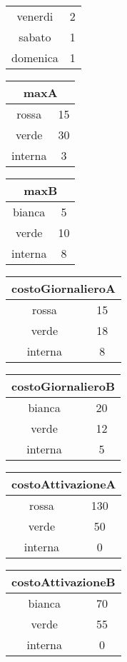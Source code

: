 \begin{center}
\begin{tabular}{| c | c |}
    venerdi & 2 \\
    sabato & 1 \\
    domenica & 1 \\
    \hline
\end{tabular}
\newline
\begin{tabular}{| c | c |}
    \hline
    \multicolumn{2}{|c|}{maxA}\\
    \hline \hline
    rossa & 15 \\
    verde & 30 \\
    interna & 3 \\
    \hline    
\end{tabular}
\begin{tabular}{| c | c |}
    \hline
    \multicolumn{2}{|c|}{maxB} \\
    \hline \hline
    bianca & 5 \\
    verde & 10 \\
    interna & 8 \\
    \hline    
\end{tabular}
\begin{tabular}{| c | c |}
    \hline
    \multicolumn{2}{|c|}{costoGiornalieroA}\\
    \hline \hline
    rossa & 15 \\
    verde & 18 \\
    interna & 8 \\
    \hline    
\end{tabular}
\begin{tabular}{| c | c |}
    \hline
    \multicolumn{2}{|c|}{costoGiornalieroB} \\
    \hline \hline
    bianca & 20 \\
    verde & 12 \\
    interna & 5 \\
    \hline    
\end{tabular}
\begin{tabular}{| c | c |}
    \hline
    \multicolumn{2}{|c|}{costoAttivazioneA}\\
    \hline \hline
    rossa & 130 \\
    verde & 50 \\
    interna & 0 \\
    \hline    
\end{tabular}
\begin{tabular}{| c | c |}
    \hline
    \multicolumn{2}{|c|}{costoAttivazioneB} \\
    \hline \hline
    bianca & 70 \\
    verde & 55 \\
    interna & 0 \\
    \hline    
\end{tabular}
\end{center}
